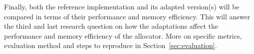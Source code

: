 Finally, both the reference implementation and its adapted version(s) will be compared in terms of their performance and memory efficiency. This will answer the third and last research question on how the adaptations affect the performance and memory efficiency of the allocator. More on specific metrics, evaluation method and steps to reproduce in Section~\ref{sec:evaluation}.

